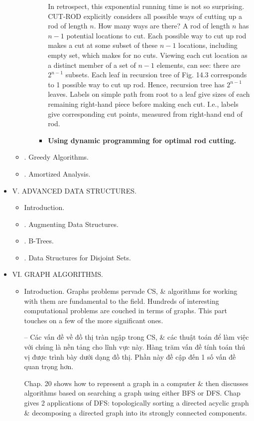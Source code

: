 \documentclass{article}
\begin{document}
\begin{itemize}
\begin{itemize}
\begin{itemize}
\begin{itemize}
				In retrospect, this exponential running time is not so surprising. CUT-ROD explicitly considers all possible ways of cutting up a rod of length $n$. How many ways are there? A rod of length $n$ has $n - 1$ potential locations to cut. Each possible way to cut up rod makes a cut at some subset of these $n - 1$ locations, including empty set, which makes for no cuts. Viewing each cut location as a distinct member of a set of $n - 1$ elements, can see: there are $2^{n-1}$ subsets. Each leaf in recursion tree of {\sf Fig. 14.3} corresponds to 1 possible way to cut up rod. Hence, recursion tree has $2^{n-1}$ leaves. Labels on simple path from root to a leaf give sizes of each remaining right-hand piece before making each cut. I.e., labels give corresponding cut points, measured from right-hand end of rod.
				\item {\bf Using dynamic programming for optimal rod cutting.}
			\end{itemize}
		\end{itemize}
		\item {. Greedy Algorithms.}
		\item {. Amortized Analysis.}
	\end{itemize}
	\item {\sf V. ADVANCED DATA STRUCTURES.}
	\begin{itemize}
		\item {\sf Introduction.}
		\item {. Augmenting Data Structures.}
		\item {. B-Trees.}
		\item {. Data Structures for Disjoint Sets.}
	\end{itemize}
	\item {\sf VI. GRAPH ALGORITHMS.}
	\begin{itemize}
		\item {\sf Introduction.} Graphs problems pervade CS, \& algorithms for working with them are fundamental to the field. Hundreds of interesting computational problems are couched in terms of graphs. This part touches on a few of the more significant ones.
		
		-- Các vấn đề về đồ thị tràn ngập trong CS, \& các thuật toán để làm việc với chúng là nền tảng cho lĩnh vực này. Hàng trăm vấn đề tính toán thú vị được trình bày dưới dạng đồ thị. Phần này đề cập đến 1 số vấn đề quan trọng hơn.
		
		Chap. 20 shows how to represent a graph in a computer \& then discusses algorithms based on searching a graph using either BFS or DFS. Chap gives 2 applications of DFS: topologically sorting a directed acyclic graph \& decomposing a directed graph into its strongly connected components.
		

\end{itemize}
\end{itemize}
\end{document}
